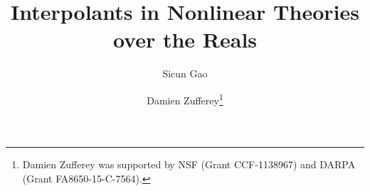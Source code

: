 \documentclass{llncs}
\begin{document}

\title{Interpolants in Nonlinear Theories over the Reals}
\author{Sicun Gao \and Damien Zufferey\thanks{Damien Zufferey was supported by NSF (Grant CCF-1138967) and DARPA (Grant FA8650-15-C-7564).}}


\maketitle

\begin{abstract}

\end{abstract}










\appendix
%
\end{document}
